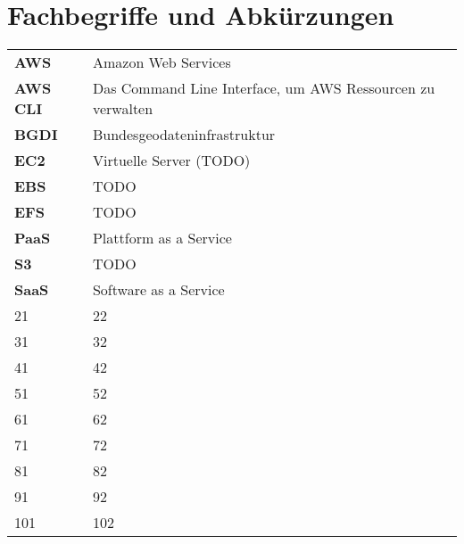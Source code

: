 \section{Fachbegriffe und Abkürzungen}
\begin{tabular}{ll}
    \textbf{AWS} & Amazon Web Services\\
    \textbf{AWS CLI} & Das Command Line Interface, um AWS Ressourcen zu verwalten\\
    \textbf{BGDI} & Bundesgeodateninfrastruktur\\
    \textbf{EC2} & Virtuelle Server (TODO)\\
    \textbf{EBS} & TODO\\
    \textbf{EFS} & TODO\\
	\textbf{PaaS} & Plattform as a Service\\
	\textbf{S3} & TODO\\
	\textbf{SaaS} & Software as a Service\\
	21 & 22\\
	31 & 32\\
	41 & 42\\
	51 & 52\\
	61 & 62\\
	71 & 72\\
	81 & 82\\
	91 & 92\\
	101 & 102\\
\end{tabular}
